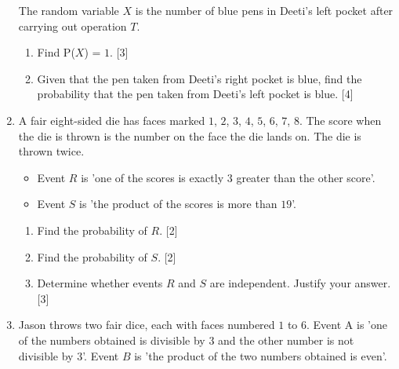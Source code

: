 \begin{enumerate}
The random variable $X$ is the number of blue pens in Deeti's left pocket after carrying out operation $T$.

\begin{enumerate}[resume,label=(\roman*)]
	\item Find P($X$) = $1$. \hfill[3]
	\item Given that the pen taken from Deeti's right pocket is blue, find the probability that the pen taken
	from Deeti's left pocket is blue. \hfill [4]
\end{enumerate}



\item A fair eight-sided die has faces marked $1$, $2$, $3$, $4$, $5$, $6$, $7$, $8$. The score when the die is thrown is the number on the face the die lands on. The die is thrown twice.

\begin{itemize}
	\setlength\itemsep{0.5em}
	\item Event $R$ is 'one of the scores is exactly $3$ greater than the other score'.
	\item Event $S$ is 'the product of the scores is more than $19$'.
\end{itemize}

\begin{enumerate}[label=(\roman*)]
	\item Find the probability of $R$. \hfill[2]
	\item Find the probability of $S$. \hfill[2]
	\item Determine whether events $R$ and $S$ are independent. Justify your answer. \hfill[3]
\end{enumerate}


\item Jason throws two fair dice, each with faces numbered $1$ to $6$. Event A is 'one of the numbers obtained
is divisible by $3$ and the other number is not divisible by $3$'. Event $B$ is 'the product of the two
numbers obtained is even'.


\end{enumerate}
